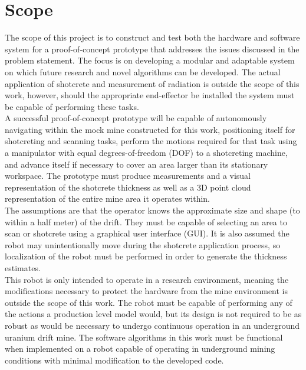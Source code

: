 \section{Scope}
\label{sec:scope}

The scope of this project is to construct and test both the hardware and software system for a proof-of-concept prototype that addresses the issues discussed in the problem statement. The focus is on developing a modular and adaptable system on which future research and novel algorithms can be developed. The actual application of shotcrete and measurement of radiation is outside the scope of this work, however, should the appropriate end-effector be installed the system must be capable of performing these tasks.\\

A successful proof-of-concept prototype will be capable of autonomously navigating within the mock mine constructed for this work, positioning itself for shotcreting and scanning tasks, perform the motions required for that task using a manipulator with equal degrees-of-freedom (DOF) to a shotcreting machine, and advance itself if necessary to cover an area larger than its stationary workspace. The prototype must produce measurements and a visual representation of the shotcrete thickness as well as a 3D point cloud representation of the entire mine area it operates within.\\

The assumptions are that the operator knows the approximate size and shape (to within a half meter) of the drift. They must be capable of selecting an area to scan or shotcrete using a graphical user interface (GUI). It is also assumed the robot may unintentionally move during the shotcrete application process, so localization of the robot must be performed in order to generate the thickness estimates.\\

This robot is only intended to operate in a research environment, meaning the modifications necessary to protect the hardware from the mine environment is outside the scope of this work. The robot must be capable of performing any of the actions a production level model would, but its design is not required to be as robust as would be necessary to undergo continuous operation in an underground uranium drift mine. The software algorithms in this work must be functional when implemented on a robot capable of operating in underground mining conditions with minimal modification to the developed code.\\

